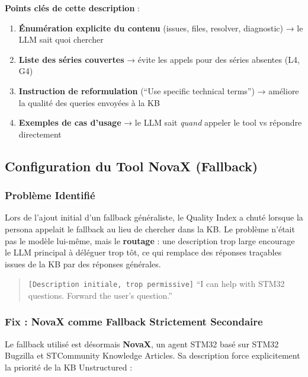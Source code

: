 \textbf{Points clés de cette description} :
\begin{enumerate}
  \item \textbf{Énumération explicite du contenu} (issues, files, resolver, diagnostic) → le LLM sait quoi chercher
  \item \textbf{Liste des séries couvertes} → évite les appels pour des séries absentes (L4, G4)
  \item \textbf{Instruction de reformulation} (``Use specific technical terms'') → améliore la qualité des queries envoyées à la KB
  \item \textbf{Exemples de cas d'usage} → le LLM sait \textit{quand} appeler le tool vs répondre directement
\end{enumerate}

\subsection{Configuration du Tool NovaX (Fallback)}

\subsubsection{Problème Identifié}

Lors de l'ajout initial d'un fallback généraliste, le Quality Index a chuté lorsque la persona appelait le fallback au lieu de chercher dans la KB. Le problème n'était pas le modèle lui-même, mais le \textbf{routage} : une description trop large encourage le LLM principal à déléguer trop tôt, ce qui remplace des réponses traçables issues de la KB par des réponses générales.

\begin{quote}
\small\texttt{[Description initiale, trop permissive]} ``I can help with STM32 questions. Forward the user's question.''
\end{quote}

\subsubsection{Fix : NovaX comme Fallback Strictement Secondaire}

Le fallback utilisé est désormais \textbf{NovaX}, un agent STM32 basé sur STM32 Bugzilla et STCommunity Knowledge Articles. Sa description force explicitement la priorité de la KB Unstructured :

